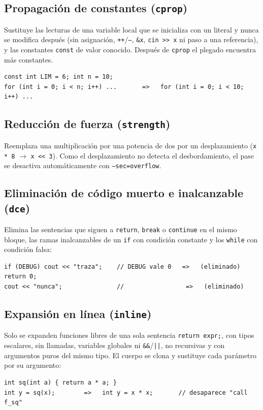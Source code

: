 \documentclass[11pt,a4paper]{article}
\newcommand{\cod}[1]{\texttt{#1}}
\begin{document}
\subsection{Propagación de constantes (\cod{cprop})}
Sustituye las lecturas de una variable local que se inicializa con un literal y nunca se modifica después
(sin asignación, \cod{++}/\cod{--}, \cod{\&x}, \cod{cin >> x} ni paso a una referencia), y las constantes
\cod{const} de valor conocido. Después de \cod{cprop} el plegado encuentra más constantes.
\begin{lstlisting}
const int LIM = 6; int n = 10;
for (int i = 0; i < n; i++) ...       =>   for (int i = 0; i < 10; i++) ...
\end{lstlisting}

\subsection{Reducción de fuerza (\cod{strength})}
Reemplaza una multiplicación por una potencia de dos por un desplazamiento (\cod{x * 8} $\rightarrow$
\cod{x << 3}). Como el desplazamiento no detecta el desbordamiento, el pase se desactiva automáticamente con
\cod{--sec=overflow}.

\subsection{Eliminación de código muerto e inalcanzable (\cod{dce})}
Elimina las sentencias que siguen a \cod{return}, \cod{break} o \cod{continue} en el mismo bloque, las ramas
inalcanzables de un \cod{if} con condición constante y los \cod{while} con condición falsa:
\begin{lstlisting}
if (DEBUG) cout << "traza";    // DEBUG vale 0   =>   (eliminado)
return 0;
cout << "nunca";               //                 =>   (eliminado)
\end{lstlisting}

\subsection{Expansión en línea (\cod{inline})}
Solo se expanden funciones libres de una sola sentencia \cod{return expr;}, con tipos escalares, sin llamadas,
variables globales ni \cod{\&\&}/\cod{||}, no recursivas y con argumentos puros del mismo tipo. El cuerpo se clona y
sustituye cada parámetro por su argumento:
\begin{lstlisting}
int sq(int a) { return a * a; }
int y = sq(x);        =>   int y = x * x;       // desaparece "call f_sq"
\end{lstlisting}
\end{document}
